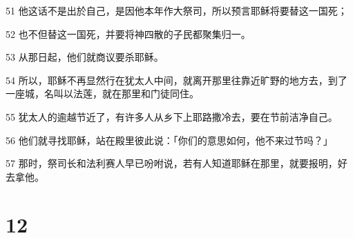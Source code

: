 \par 51 他这话不是出於自己，是因他本年作大祭司，所以预言耶稣将要替这一国死；
\par 52 也不但替这一国死，并要将神四散的子民都聚集归一。
\par 53 从那日起，他们就商议要杀耶稣。
\par 54 所以，耶稣不再显然行在犹太人中间，就离开那里往靠近旷野的地方去，到了一座城，名叫以法莲，就在那里和门徒同住。
\par 55 犹太人的逾越节近了，有许多人从乡下上耶路撒冷去，要在节前洁净自己。
\par 56 他们就寻找耶稣，站在殿里彼此说：「你们的意思如何，他不来过节吗？」
\par 57 那时，祭司长和法利赛人早已吩咐说，若有人知道耶稣在那里，就要报明，好去拿他。

\chapter{12}

